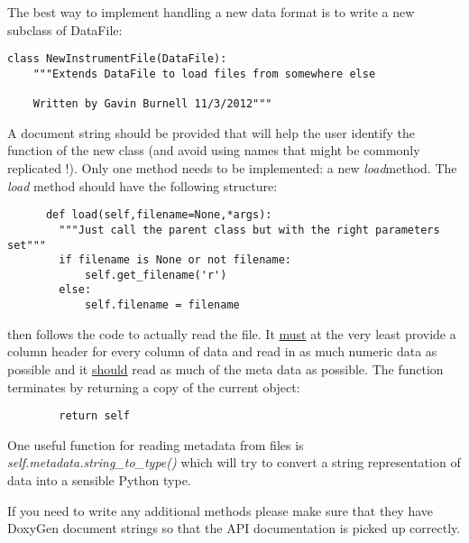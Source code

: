 \documentclass[a4paper,11pt]{scrartcl}
\begin{document}
The best way to implement handling a new data format is to write a new subclass of DataFile:
 \begin{verbatim}
class NewInstrumentFile(DataFile):
    """Extends DataFile to load files from somewhere else
    
    Written by Gavin Burnell 11/3/2012"""
 \end{verbatim}
 A document string should be provided that will help the user identify the function of the new class (and avoid using names that might be commonly replicated !). Only one method needs to be implemented: a new \textit{load}method. The \textit{load} method should have the following structure:
\begin{verbatim}
      def load(self,filename=None,*args):
        """Just call the parent class but with the right parameters set"""
        if filename is None or not filename:
            self.get_filename('r')
        else:
            self.filename = filename
\end{verbatim}
then follows the code to actually read the file. It \underline{must} at the very least provide a column header for every column of data and read in as much numeric data as possible and it \underline{should} read as much of the meta data as possible. The function terminates by returning a copy of the current object:
\begin{verbatim}
        return self
\end{verbatim}
One useful function for reading metadata from files is \textit{self.metadata.string\_to\_type()} which will try to convert a string representation of data into a sensible Python type.

If you need to write any additional methods please make sure that they have DoxyGen document strings so that the API documentation is picked up correctly.
\end{document}
